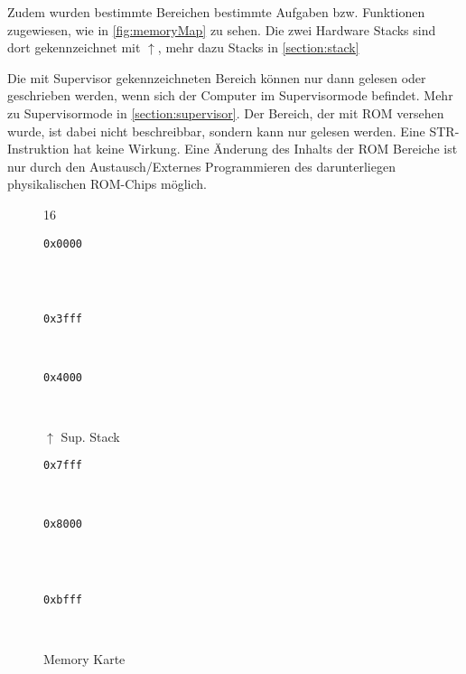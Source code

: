 \documentclass{scrartcl}
\begin{document}
Zudem wurden bestimmte Bereichen bestimmte Aufgaben bzw. Funktionen zugewiesen, wie in \autoref{fig:memoryMap} zu sehen.
Die zwei Hardware Stacks sind dort gekennzeichnet mit $\uparrow$, mehr dazu Stacks in \autoref{section:stack}

Die mit Supervisor gekennzeichneten Bereich können nur dann gelesen oder geschrieben werden, wenn sich der Computer im Supervisormode befindet.
Mehr zu Supervisormode in \autoref{section:supervisor}.
Der Bereich, der mit ROM versehen wurde, ist dabei nicht beschreibbar, sondern kann nur gelesen werden.
Eine STR-Instruktion hat keine Wirkung.
Eine Änderung des Inhalts der ROM Bereiche ist nur durch den Austausch/Externes Programmieren des darunterliegen physikalischen ROM-Chips möglich.

\begin{figure}[h]
	\centering
	\caption{Memory Karte}
	\label{fig:memoryMap}
	\begin{bytefield}[leftcurly=., rightcurly=., leftcurlyspace=0pt, rightcurlyspace=0pt]{16}
		
		\begin{leftwordgroup}{\small \texttt{0x0000}}
		\end{leftwordgroup}\\
		 \\
		\begin{leftwordgroup}{\small \texttt{0x3fff}}
		\end{leftwordgroup}\\

		\begin{leftwordgroup}{\small \texttt{0x4000}}
		\end{leftwordgroup}\\
		\begin{rightwordgroup}{\large $\uparrow$ Sup. Stack}
			 \\
		\end{rightwordgroup}
		\begin{leftwordgroup}{\small \texttt{0x7fff}}
		\end{leftwordgroup}\\

		\begin{leftwordgroup}{\small \texttt{0x8000}}
		\end{leftwordgroup}\\
			 \\
		\begin{leftwordgroup}{\small \texttt{0xbfff}}
		\end{leftwordgroup}\\


\end{bytefield}
\end{figure}
\end{document}
